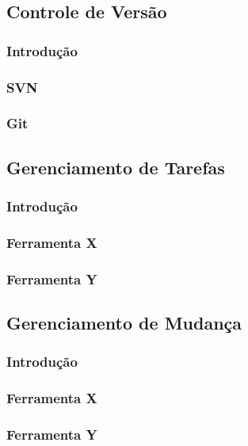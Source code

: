 \documentclass[12pt,a4paper]{article}
\begin{document}
	\subsection{Controle de Versão}
		\subsubsection{Introdução}
		\subsubsection{SVN}
		\subsubsection{Git}
		
	\subsection{Gerenciamento de Tarefas}
		\subsubsection{Introdução}
		\subsubsection{Ferramenta X}
		\subsubsection{Ferramenta Y}
	
	\subsection{Gerenciamento de Mudança}
		\subsubsection{Introdução}
		\subsubsection{Ferramenta X}
		\subsubsection{Ferramenta Y}
		
		

\clearpage
\nocite{*}
		
		
\end{document}

